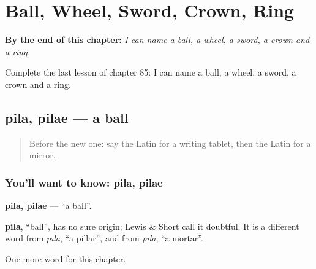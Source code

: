 
\chapter{Ball, Wheel, Sword, Crown, Ring}
\label{ch:la-ball-wheel-sword-crown-ring}

\begin{chapteropening}
\textbf{By the end of this chapter:} \emph{I can name a ball, a wheel, a sword, a crown and a ring.}

Complete the last lesson of chapter 85: I can name a ball, a wheel, a sword, a crown and a ring.
\end{chapteropening}

\section[pila, pilae]{pila, pilae — a ball}

\label{lesson:LA-C85-pila}



\begin{quote}
Before the new one: say the Latin for a writing tablet, then the Latin for a mirror.
\end{quote}

\subsection*{You'll want to know: pila, pilae}
\textbf{pila, pilae} — \textquotedblleft{}a ball\textquotedblright{}.

\begin{cousinweb}
\textbf{pila}, \textquotedblleft{}ball\textquotedblright{}, has no sure origin; Lewis \& Short call it doubtful. It is a different word from \emph{pīla}, \textquotedblleft{}a pillar\textquotedblright{}, and from \emph{pīla}, \textquotedblleft{}a mortar\textquotedblright{}.
\end{cousinweb}

\begin{grammarlens}[title={What you've built}]
One more word for this chapter.
\end{grammarlens}

